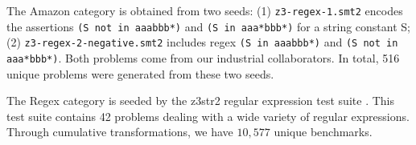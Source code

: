 \begin{table}[h]
\vspace{-0.35in}
\centering
\caption{Transformed problem sets generated by \transformer{}.}
\label{tbl:transformed}
{
  \footnotesize
  \bgroup
  \def\arraystretch{1}
  \egroup
  \vspace{-0.2in}
}
\end{table}  
    

    The Amazon category is obtained from two seeds: (1) \texttt{z3-regex-1.smt2} encodes the assertions \texttt{(S not in aaabbb*)} and \texttt{(S in aaa*bbb*)} for a string constant S; (2) \texttt{z3-regex-2-negative.smt2} includes regex \texttt{(S in aaabbb*)} and \texttt{(S not in aaa*bbb*)}.
    Both problems come from our industrial collaborators. In total, 516 unique problems were generated from these two seeds.

    The Regex category is seeded by the z3str2 regular expression test suite \cite{z3str2-tests}.
    This test suite contains 42 problems dealing with a wide variety of regular expressions.
    Through cumulative transformations, we have $10,577$ unique benchmarks.


